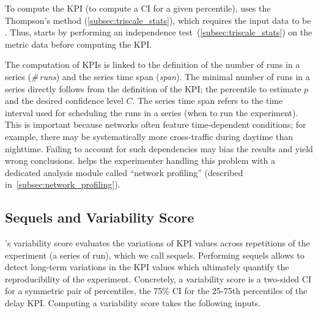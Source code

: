 To compute the KPI (\ie to compute a CI for a given percentile), \triscale uses the Thompson's method (\cref{subsec:triscale_stats}), which requires the input data to be \iid.
Thus, \triscale starts by performing an independence test~(\cref{subsec:triscale_stats})
on the metric data before computing the KPI.


The computation of \triscale KPIs is linked to the definition of the number of runs in a series (\emph{\#\,runs}) and the series time span (\emph{span}).
The minimal number of runs in a series directly follows from the definition of the KPI; \ie the percentile to estimate $p$ and the desired confidence level $C$.
The series time span refers to the time interval used for scheduling the runs in a series (\ie when to run the experiment).
This is important because networks often feature time-dependent conditions; for example, there may be systematically more cross-traffic during daytime than nighttime. Failing to account for such dependencies may bias the results and yield wrong conclusions.
\triscale helps the experimenter handling this problem with a dedicated analysis module called ``network profiling'' (described in~\cref{subsec:network_profiling}).



\subsection{Sequels and Variability Score}
\label{subsec:repeatability}


\triscale's variability score evaluates the variations of KPI values across repetitions of the experiment (\ie a series of run), which we call sequels.
Performing sequels allows to detect long-term variations in the KPI values which ultimately quantify the reproducibility of the experiment.
Concretely, a variability score is a two-sided CI for a symmetric pair of percentiles, \eg the 75\% CI for the 25-75th percentiles of the delay KPI.
Computing a variability score takes the following inputs.

